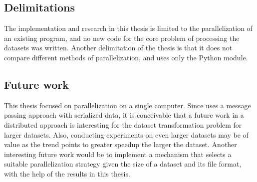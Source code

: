 \subsection{Delimitations}
The implementation and research in this thesis is limited to the parallelization of an existing program, and no new code for the core problem
of processing the datasets was written. Another delimitation of the thesis is that it does not compare different methods of parallelization,
and uses only the Python  module.

\subsection{Future work}
This thesis focused on parallelization on a single computer. Since  uses a message passing approach with serialized data,
it is conceivable that a future work in a distributed approach is interesting for the dataset transformation problem for larger datasets. Also,
conducting experiments on even larger datasets may be of value as the trend points to greater speedup the larger the dataset. Another interesting
future work would be to implement a mechanism that selects a suitable parallelization strategy given the size of a dataset and its file format, with
the help of the results in this thesis.

